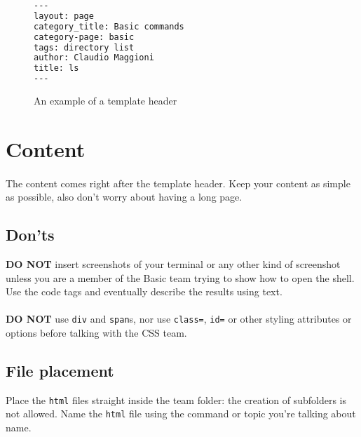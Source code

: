 \documentclass[hidelinks,12pt,a4paper,numbers=enddot]{scrartcl}
\begin{document}
\begin{figure}[h]
\begin{lstlisting}[language=html]
---
layout: page
category_title: Basic commands
category-page: basic
tags: directory list
author: Claudio Maggioni
title: ls
---
\end{lstlisting}
\caption{An example of a template header}
\end{figure}

\section{Content}

\paragraph{}
The content comes right after the template header.
Keep your content as simple as possible, also don't worry about having a long page.

\subsection{Don'ts}
\textbf{DO NOT} insert screenshots of your terminal or any other kind of screenshot
unless you are a member of the Basic team trying to show how to open the shell. Use
the code tags and eventually describe the results using text.

\paragraph{}
\textbf{DO NOT} use \texttt{div} and \texttt{span}s, nor use \texttt{class=}, \texttt{id=}
or other styling attributes or options before talking with the CSS team. 

\subsection{File placement}
Place the \texttt{html} files straight inside the team folder: the creation of subfolders is not
allowed. Name the \texttt{html} file using the command or topic you're talking about name.
\end{document}
